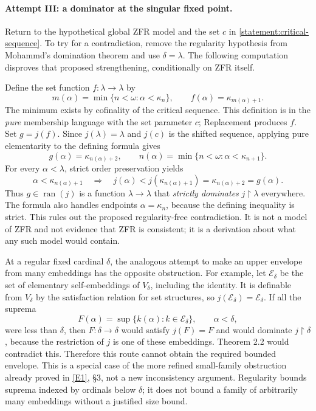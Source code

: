 \documentclass[11pt]{article}
\newcommand{\eref}[2]{\hyperlink{extra:#1:#2}{[E#2]}}
\begin{document}
\paragraph{Attempt III: a dominator at the singular fixed point.}
Return to the hypothetical global ZFR model and the set $c$ in
\eqref{statement:critical-sequence}.  To try for a contradiction, remove the
regularity hypothesis from Mohammd's domination theorem and use $\delta=\lambda$.
The following computation disproves that proposed strengthening, conditionally
on ZFR itself.

Define the set function $f:\lambda\to\lambda$ by
\[
 m(\alpha)=\min\{n<\omega:\alpha<\kappa_n\},\qquad
 f(\alpha)=\kappa_{m(\alpha)+1}.
\]
The minimum exists by cofinality of the critical sequence.  This definition is
in the \emph{pure} membership language with the set parameter $c$; Replacement
produces $f$.  Set $g=j(f)$.  Since $j(\lambda)=\lambda$ and $j(c)$ is the
shifted sequence, applying pure elementarity to the defining formula gives
\begin{equation}\label{statement:singular-dominator}
 g(\alpha)=\kappa_{n(\alpha)+2},\qquad
 n(\alpha)=\min\{n<\omega:\alpha<\kappa_{n+1}\}.
\end{equation}
For every $\alpha<\lambda$, strict order preservation yields
\[
 \alpha<\kappa_{n(\alpha)+1}
 \quad\Longrightarrow\quad
 j(\alpha)<j(\kappa_{n(\alpha)+1})
       =\kappa_{n(\alpha)+2}=g(\alpha).
\]
Thus $g\in\operatorname{ran}(j)$ is a function $\lambda\to\lambda$ that
\emph{strictly dominates} $j\!\upharpoonright\!\lambda$ everywhere.
The formula also handles endpoints $\alpha=\kappa_n$, because the defining
inequality is strict.  This rules out the proposed regularity-free
contradiction.  It is not a model of ZFR and not evidence that ZFR is
consistent; it is a derivation about what any such model would contain.

At a regular fixed cardinal $\delta$, the analogous attempt to make an upper
envelope from many embeddings has the opposite obstruction.  For example,
let $\mathcal E_\delta$ be the set of elementary self-embeddings of $V_\delta$,
including the identity.  It is definable from $V_\delta$ by the satisfaction
relation for set structures, so $j(\mathcal E_\delta)=\mathcal E_\delta$.
If all the suprema
\[
 F(\alpha)=\sup\{k(\alpha):k\in\mathcal E_\delta\},\qquad \alpha<\delta,
\]
were less than $\delta$, then $F:\delta\to\delta$ would satisfy $j(F)=F$ and
would dominate $j\!\upharpoonright\!\delta$, because the restriction of $j$
is one of these embeddings.  Theorem 2.2 would contradict this.  Therefore
this route cannot obtain the required bounded envelope.  This is a special
case of the more refined small-family obstruction already proved in
\eref{statement}{1}, \S3, not a new inconsistency argument.  Regularity bounds
suprema indexed by ordinals below $\delta$; it does not bound a family of
arbitrarily many embeddings without a justified size bound.
\end{document}
